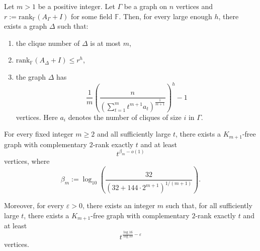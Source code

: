 \documentclass[10pt,a4paper]{amsart}
\newcommand{\Ff}{{\mathbb F}}
\begin{document}
\begin{Theorem}\label{thm:BLS}
  Let $m > 1$ be a positive integer.
  Let $\Gamma$ be a graph on $n$ vertices and $r := \mathrm{rank}_\Ff(A_\Gamma+I)$
  for some field $\Ff$. Then, for every large enough $h$, there exists a graph $\Delta$
  such that:
  \begin{enumerate}
   \item the clique number of $\Delta$ is at most $m$,
   \item $\mathrm{rank}_\Ff(A_\Delta+I) \leq r^h$,
   \item the graph $\Delta$ has
   \[
    \frac{1}{m} \left( \frac{n}{\left( \sum_{t=1}^m t^{m+1} a_t \right)^{\frac{1}{m+1}} } \right)^h - 1
   \]
  vertices. Here $a_i$ denotes the number of cliques of size $i$ in $\Gamma$.
  \end{enumerate}
\end{Theorem}

\begin{Proposition}\label{low2rank}
For every fixed integer $m\geq 2$ and all sufficiently large $t$, there exists a
$K_{m+1}$-free graph with complementary $2$-rank exactly $t$ and at least
\[
t^{\beta_m-o(1)}
\]
vertices, where
\[
\beta_m :=
\log_{10}\left(
\frac{32}{\left(32+144\cdot 2^{m+1}\right)^{1/(m+1)}}
\right).
\]


Moreover, for every $\varepsilon>0$, there exists an integer $m$ such that, for
all sufficiently large $t$, there exists a $K_{m+1}$-free graph with
complementary $2$-rank exactly $t$ and at least
\[
t^{\frac{\log 16}{\log 10}-\varepsilon}
\]
vertices.
\end{Proposition}
\end{document}
